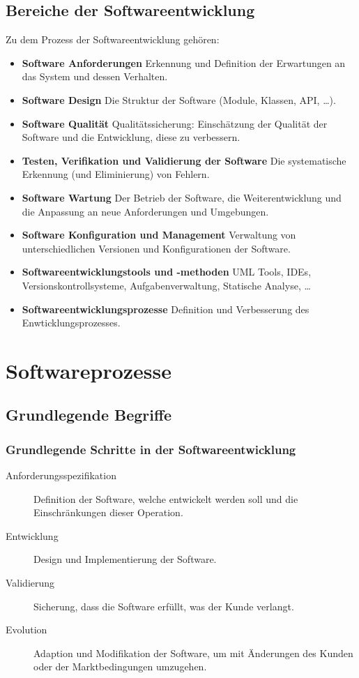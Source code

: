 	\section{Bereiche der Softwareentwicklung}
		Zu dem Prozess der Softwareentwicklung gehören:
		\begin{itemize}
			\item \textbf{Software Anforderungen} Erkennung und Definition der Erwartungen an das System und dessen Verhalten.
			\item \textbf{Software Design} Die Struktur der Software (Module, Klassen, API, \dots).
			\item \textbf{Software Qualität} Qualitätssicherung: Einschätzung der Qualität der Software und die Entwicklung, diese zu verbessern.
			\item \textbf{Testen, Verifikation und Validierung der Software} Die systematische Erkennung (und Eliminierung) von Fehlern.
			\item \textbf{Software Wartung} Der Betrieb der Software, die Weiterentwicklung und die Anpassung an neue Anforderungen und Umgebungen.
			\item \textbf{Software Konfiguration und Management} Verwaltung von unterschiedlichen Versionen und Konfigurationen der Software.
			\item \textbf{Softwareentwicklungstools und -methoden} UML Tools, IDEs, Versionskontrollsysteme, Aufgabenverwaltung, Statische Analyse, \dots
			\item \textbf{Softwareentwicklungsprozesse} Definition und Verbesserung des Enwticklungsprozesses.
		\end{itemize}

\chapter{Softwareprozesse}
	\section{Grundlegende Begriffe}
		\subsection{Grundlegende Schritte in der Softwareentwicklung}
			\begin{description}
				\item[Anforderungsspezifikation] Definition der Software, welche entwickelt werden soll und die Einschränkungen dieser Operation.
				\item[Entwicklung] Design und Implementierung der Software.
				\item[Validierung] Sicherung, dass die Software erfüllt, was der Kunde verlangt.
				\item[Evolution] Adaption und Modifikation der Software, um mit Änderungen des Kunden oder der Marktbedingungen umzugehen.
			\end{description}

